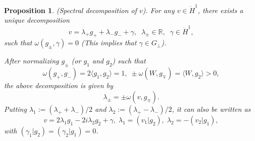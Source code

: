 \documentclass[reqno, 11pt]{amsart}
\numberwithin{equation}{section}
\newcommand{\R}{\mathbb{R}}
\theoremstyle{plain}
\newtheorem{proposition}[theorem]{Proposition}
\theoremstyle{definition}
\numberwithin{equation}{section}
\numberwithin{theorem}{section}
\numberwithin{equation}{section}
\numberwithin{equation}{section}
\numberwithin{theorem}{section}
\begin{document}
	\begin{proposition}(Spectral decomposition of $v$)\label{prop:spect decom}. For any $v \in \dot H^1$, there exists a unique decomposition
		\begin{equation}\label{decom:v+}
		v=\lambda_+g_{+} + \lambda_-g_{-}+\gamma,\;\;\lambda_{\pm}\in\R,\;\;\gamma\in  \dot H^1,
		\end{equation}
		such that $\omega(g_{\pm},\gamma)=0$ (This implies that $\gamma\in G_{\bot}$).
		
		After normalizing $g_{\pm}$ (or $g_1$ and $g_2$) such that 
		\begin{equation}\label{con:ome}
		\omega(g_{+},g_{-})=2\langle g_{1},g_{2} \rangle=1,\; \pm\omega(W,g_{\mp})=\langle W,g_2 \rangle>0,
		\end{equation}
		the above decomposition is given by
		\begin{equation*}
		\lambda_{\pm}=\pm \omega(v,g_{\mp}).
		\end{equation*}
		Putting $\lambda_1:=(\lambda_+ +\lambda_-)/2$ and $\lambda_2:=(\lambda_+ -\lambda_-)/2$, it can also be written as 
		\begin{equation}\label{decom:v1}
		v=2\lambda_{1}g_1-2i\lambda_{2}g_2+\gamma,\; \lambda_1=(v_1|g_2),\; \lambda_2=-(v_2|g_1),
		\end{equation}
		with $(\gamma_1|g_2)=(\gamma_2|g_1)=0$.
	\end{proposition}
	
\end{document}
